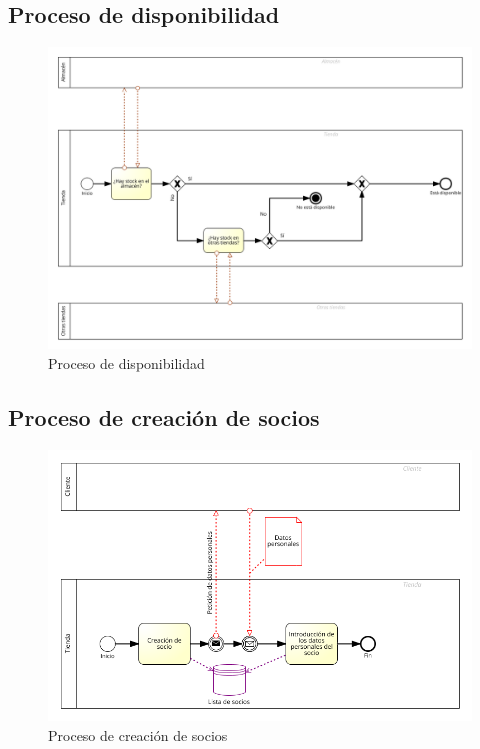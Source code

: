 \begin{landscape}
\subsection{Proceso de disponibilidad}
\begin{figure}[H]
	\includegraphics[width=\paperwidth, center]{images/bpmn/disponibilidad .png}
	\caption{Proceso de disponibilidad}
\end{figure}

\subsection{Proceso de creación de socios}
\begin{figure}[H]
	\includegraphics[width=\paperwidth, center]{images/bpmn/socios .png}
	\caption{Proceso de creación de socios}
\end{figure}
\end{landscape}

